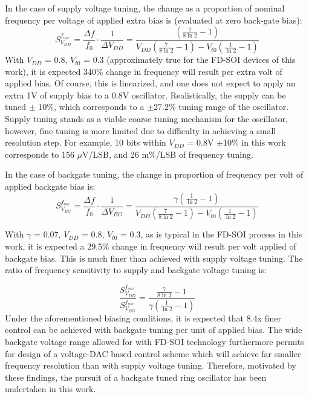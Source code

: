 		In the case of supply voltage tuning, the change as a proportion of nominal frequency per voltage of applied extra bias is (evaluated at zero back-gate bias):
		\begin{equation}
			S^{f_{osc}}_{V_{DD}} = \frac{\Delta f}{f_0}\cdot\frac{1}{\Delta V_{DD}}  = \frac{\left(\frac{7}{8\ln2}-1\right)}{V_{DD}\left(\frac{7}{8\ln2}-1\right)-V_{t0}\left(\frac{1}{\ln2}-1\right)}
		\end{equation}
		With $V_{DD}$ = 0.8, $V_{t0}$ = 0.3 (approximately true for the FD-SOI devices of this work), it is expected 340\% change in frequency will result per extra volt of applied bias. Of course, this is linearized, and one does not expect to apply an extra 1V of supply bias to a 0.8V oscillator. Realistically, the supply can be tuned $\pm$ 10\%, which corresponds to a $\pm$27.2\% tuning range of the oscillator. Supply tuning stands as a viable coarse tuning mechanism for the oscillator, however, fine tuning is more limited due to difficulty in achieving a small resolution step. For example, 10 bits within $V_{DD}$ = 0.8V $\pm$10\% in this work corresponds to 156 $\mu$V/LSB, and 26 m\%/LSB of frequency tuning.

		\par In the case of backgate tuning, the change in proportion of frequency per volt of applied backgate bias is:
		\begin{equation}
			S^{f_{osc}}_{V_{BG}} = \frac{\Delta f}{f_0}\cdot\frac{1}{\Delta V_{BG}}  = \frac{\gamma \left(\frac{1}{\ln2}-1\right)}{V_{DD}\left(\frac{7}{8\ln2}-1\right)-V_{t0}\left(\frac{1}{\ln2}-1\right)}
		\end{equation}

		With $\gamma$ = 0.07, $V_{DD}$ = 0.8, $V_{t0}$ = 0.3, as is typical in the FD-SOI process in this work, it is expected a 29.5\% change in frequency will result per volt applied of backgate bias. This is much finer than achieved with supply voltage tuning. The ratio of frequency sensitivity to supply and backgate voltage tuning is:

		\begin{equation}
			\frac{S^{f_{osc}}_{V_{DD}}}{S^{f_{osc}}_{V_{BG}}} =  \frac{\frac{7}{8\ln2}-1}{\gamma \left(\frac{1}{\ln2}-1\right)}
		\end{equation}
		Under the aforementioned biasing conditions, it is expected that 8.4x finer control can be achieved with backgate tuning per unit of applied bias. The wide backgate voltage range allowed for with FD-SOI technology furthermore permits for design of a voltage-DAC based control scheme which will achieve far smaller frequency resolution than with supply voltage tuning. Therefore, motivated by these findings, the pursuit of a backgate tuned ring oscillator has been undertaken in this work.


